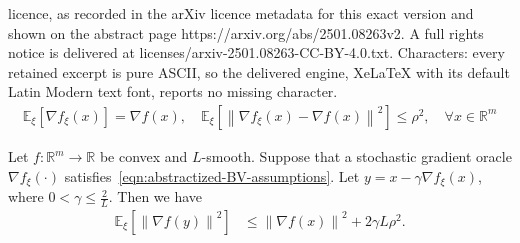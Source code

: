 \documentclass[10pt,a4paper]{amsart}
\newcommand{\reals}{\mathbb{R}}
\newcommand{\sqnorm}[1]{\left\| #1 \right\|^2}
\begin{document}
licence, as recorded in the arXiv licence metadata for this exact version and shown on the abstract page https://arxiv.org/abs/2501.08263v2. A full rights notice is delivered at licenses/arxiv-2501.08263-CC-BY-4.0.txt. Characters: every retained excerpt is pure ASCII, so the delivered engine, XeLaTeX with its default Latin Modern text font, reports no missing character.
\begin{align}
\label{eqn:abstractized-BV-assumptions}
    \mathbb{E}_\xi [\nabla f_\xi (x)] = \nabla f (x) , \quad \mathbb{E}_\xi \left[ \sqnorm{\nabla f_\xi (x) - \nabla f(x)} \right] \le \rho^2 , \quad \forall x \in \reals^m 
\end{align}

\begin{lemma}
\label{lemma:stochastic-gradient-descent-grad-norm-bound-abstract-version}
Let $f \colon \reals^m \to \reals$ be convex and $L$-smooth. 
Suppose that a stochastic gradient oracle $\nabla f_\xi (\cdot)$ satisfies~\eqref{eqn:abstractized-BV-assumptions}.
Let $y = x - \gamma \nabla f_\xi (x)$, where $0 < \gamma \le \frac{2}{L}$. Then we have
\begin{align*}
    \mathbb{E}_\xi \left[ \sqnorm{\nabla f(y)} \right] & \le \sqnorm{\nabla f(x)} + 2 \gamma L\rho^2 .
\end{align*}
\end{lemma}
\end{document}
